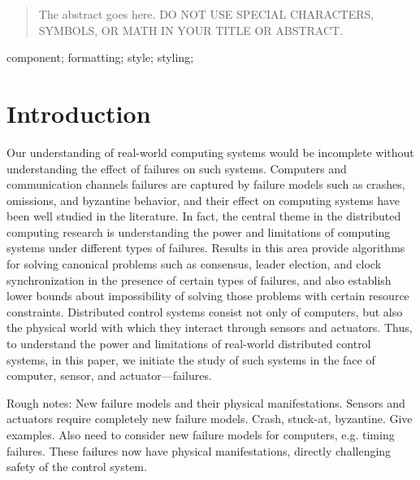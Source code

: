\documentclass[10pt, conference, compsocconf]{IEEEtran}
\begin{document}
\maketitle


\begin{abstract}
The abstract goes here. DO NOT USE SPECIAL CHARACTERS, SYMBOLS, OR MATH IN YOUR TITLE OR ABSTRACT.

\end{abstract}

\begin{IEEEkeywords}
component; formatting; style; styling;

\end{IEEEkeywords}


\def\titleName{{Towards Fault Tolerant Distributed Real-time Control}}
\def\authorName{{Taylor Johnson}}


\section{Introduction}
\label{sec:intro}

%
Our understanding of real-world computing systems would be incomplete
without understanding the effect of failures on such systems.
Computers and communication channels failures are captured by failure models 
such as crashes, omissions, and byzantine behavior, and their effect on 
computing systems have been well studied in the literature. 
%
In fact, the central theme in the distributed computing research 
is understanding the power and limitations of computing systems under 
different types of failures. 
%
Results in this area provide algorithms
for solving canonical problems 
such as consensus, leader election, and clock synchronization
in the presence of certain types of failures, and also establish 
lower bounds about impossibility of solving those 
problems with certain resource constraints. 
%
Distributed control systems consist not only of computers, 
but also the physical world with which they interact through 
sensors and actuators. 
%
Thus, to understand the power and limitations of 
real-world distributed control systems, in this paper, we 
initiate the study of such systems in the face of computer, sensor, and actuator---failures. 

Rough notes:
New failure models and their physical manifestations.
Sensors and actuators require completely new failure models.
Crash, stuck-at, byzantine.
%
Give examples.
%
Also need to consider new failure models for computers, e.g.
timing failures. 
%
These failures now have physical manifestations, 
directly challenging safety of the control system.
\end{document}
